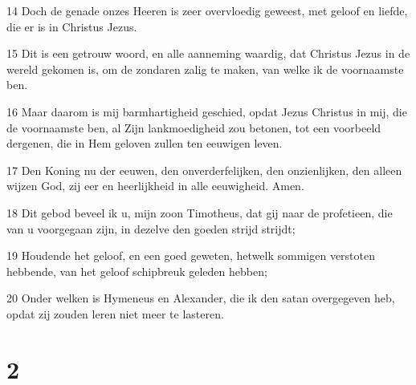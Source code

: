 \par 14 Doch de genade onzes Heeren is zeer overvloedig geweest, met geloof en liefde, die er is in Christus Jezus.
\par 15 Dit is een getrouw woord, en alle aanneming waardig, dat Christus Jezus in de wereld gekomen is, om de zondaren zalig te maken, van welke ik de voornaamste ben.
\par 16 Maar daarom is mij barmhartigheid geschied, opdat Jezus Christus in mij, die de voornaamste ben, al Zijn lankmoedigheid zou betonen, tot een voorbeeld dergenen, die in Hem geloven zullen ten eeuwigen leven.
\par 17 Den Koning nu der eeuwen, den onverderfelijken, den onzienlijken, den alleen wijzen God, zij eer en heerlijkheid in alle eeuwigheid. Amen.
\par 18 Dit gebod beveel ik u, mijn zoon Timotheus, dat gij naar de profetieen, die van u voorgegaan zijn, in dezelve den goeden strijd strijdt;
\par 19 Houdende het geloof, en een goed geweten, hetwelk sommigen verstoten hebbende, van het geloof schipbreuk geleden hebben;
\par 20 Onder welken is Hymeneus en Alexander, die ik den satan overgegeven heb, opdat zij zouden leren niet meer te lasteren.

\chapter{2}

